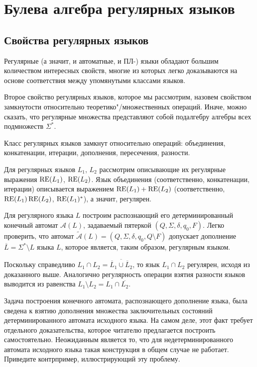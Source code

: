 \chapter{Булева алгебра регулярных языков}
\label{Chapter5}
\section{Свойства регулярных языков}
\label{Chapter5PropsReg}
Регулярные (а значит, и автоматные, и ПЛ-) языки обладают большим количеством интересных свойств, многие из которых легко доказываются на основе соответствия между упомянутыми классами языков.

Второе свойство регулярных языков, которое мы рассмотрим, назовем свойством замкнутости относительно теоретико"/множественных операций. Иначе, можно сказать, что регулярные множества представляют собой подалгебру алгебры всех подмножеств $\Sigma^*$.

\begin{mytheorem}Класс регулярных языков замкнут относительно операций: объединения, конкатенации, итерации, дополнения, пересечения, разности.
\end{mytheorem}

\begin{myproof}Для регулярных языков $L_1$, $L_2$ рассмотрим описывающие
их регулярные выражения $\operatorname{RE}(L_1)$, $\operatorname{RE}(L_2)$. Язык объединения
(соответственно, конкатенации, итерации) описывается выражением $\operatorname{RE}(L_1) +
\operatorname{RE}(L_2)$ (соответственно, $\operatorname{RE}(L_1)\operatorname{RE}(L_2)$, $\operatorname{RE}(L_1)^\ast$), а значит,
регулярен.

Для регулярного языка $L$ построим распознающий его
детерминированный конечный автомат $\mathcal A(L)$, задаваемый пятеркой $(Q, \Sigma, \delta, q_0, F)$. Легко
проверить, что автомат $\widetilde{\mathcal A}(L) = (Q, \Sigma, \delta, q_0, Q
\setminus F)$ допускает дополнение $\overline L = \Sigma^\ast \setminus L$ языка
$L$, которое является, таким образом, регулярным языком.

Поскольку справедливо $L_1 \cap L_2 = \overline{\overline L_1 \cup \overline
L_2}$, то язык $L_1 \cap L_2$ регулярен, исходя из доказанного выше.
Аналогично регулярность операции взятия разности языков выводится из
равенства $L_1 \setminus L_2 = L_1 \cap \overline{L_2}$.
\end{myproof}

\begin{myproblem}
Задача построения конечного автомата, распознающего дополнение
языка, была сведена к взятию дополнения множества заключительных
состояний детерминированного автомата исходного языка. На самом деле, этот факт
требует отдельного доказательства, которое читателю предлагается
построить самостоятельно. Неожиданным является то, что для
недетерминированного автомата исходного языка
такая конструкция в общем случае не
работает. Приведите контрпример, иллюстрирующий эту проблему.
\end{myproblem}

